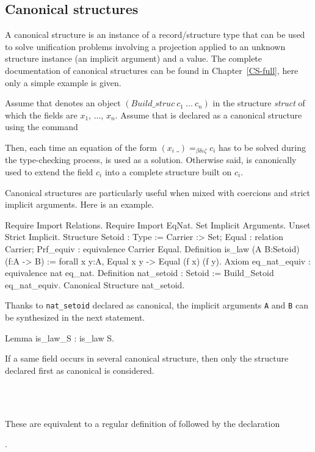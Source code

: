\subsection{Canonical structures
}

A canonical structure is an instance of a record/structure type that
can be used to solve unification problems involving a projection
applied to an unknown structure instance (an implicit argument) and
a value.  The complete documentation of canonical structures can be found
in Chapter~\ref{CS-full}, here only a simple example is given.

Assume that {\qualid} denotes an object $(Build\_struc~ c_1~ \ldots~ c_n)$ in
the
structure {\em struct} of which the fields are $x_1$, ...,
$x_n$. Assume that {\qualid} is declared as a canonical structure
using the command
\begin{quote}
{}
\end{quote}
Then, each time an equation of the form $(x_i~
\_)=_{\beta\delta\iota\zeta}c_i$ has to be solved during the
type-checking process, {\qualid} is used as a solution. Otherwise
said, {\qualid} is canonically used to extend the field $c_i$ into a
complete structure built on $c_i$.

Canonical structures are particularly useful when mixed with
coercions and strict implicit arguments. Here is an example.
\begin{coq_example*}
Require Import Relations.
Require Import EqNat.
Set Implicit Arguments.
Unset Strict Implicit.
Structure Setoid : Type := 
  {Carrier :> Set;
   Equal : relation Carrier;
   Prf_equiv : equivalence Carrier Equal}.
Definition is_law (A B:Setoid) (f:A -> B) :=
  forall x y:A, Equal x y -> Equal (f x) (f y).
Axiom eq_nat_equiv : equivalence nat eq_nat.
Definition nat_setoid : Setoid := Build_Setoid eq_nat_equiv.
Canonical Structure nat_setoid.
\end{coq_example*}

Thanks to \texttt{nat\_setoid} declared as canonical, the implicit
arguments {\tt A} and {\tt B} can be synthesized in the next statement.
\begin{coq_example}
Lemma is_law_S : is_law S.
\end{coq_example}

\Rem If a same field occurs in several canonical structure, then
only the structure declared first as canonical is considered.

\begin{Variants}
\item {}\\
 {}\\
 {}

These are equivalent to a regular definition of {\ident} followed by
the declaration 

{}.
\end{Variants}


